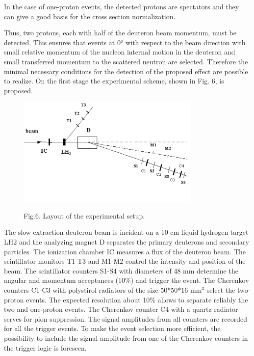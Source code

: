 \documentclass[a4paper,12pt]{article}
\begin{document}
In the case of one-proton events, the detected
protons are spectators and they can give a good basis for the cross section
normalization.

Thus, two protons, each with half of the deuteron beam momentum, must be
detected. This ensures that events at 0$^o$ with respect to the beam direction
with small relative momentum of the nucleon internal motion in the deuteron
and small transferred momentum to the scattered neutron are selected.
Therefore the minimal necessary conditions for the detection of the proposed
effect are possible to realize. On the first stage the experimental scheme,
shown in Fig. 6, is proposed.
\begin{figure}[hbt]
  \begin{center}
    \includegraphics[width=9cm]{image2.pdf}
  \end{center}
  \vspace{0,4mm}
  Fig.6.  Layout of the experimental setup. \\

\end{figure}

The slow extraction deuteron beam is incident
on a 10-cm liquid hydrogen target LH2 and the analyzing magnet D separates
the primary deuterons and secondary particles. The ionization chamber IC
measures a flux of the deuteron beam. The scintillator monitors T1-T3
and M1-M2 control the intensity and position of the beam. The scintillator
counters S1-S4 with diameters of 48 mm determine the angular and momentum
acceptances (10$\%$) and trigger the event. The Cherenkov counters C1-C3 with
polystirol radiators of the size 50*50*16 mm$^3$ select the two-proton events.
The expected resolution about 10$\%$ allows to separate reliably the two
and one-proton events. The Cherenkov counter C4 with a quartz radiator
serves for pion suppression. The signal amplitudes from all counters are
recorded for all the trigger events. To make the event selection more
efficient, the possibility to include the signal amplitude from
one of the Cherenkov counters in the trigger logic is foreseen.
\end{document}
